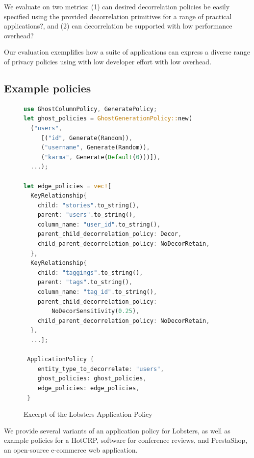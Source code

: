 %

We evaluate \sys on two metrics: (1) can desired decorrelation policies be easily specified using the
provided decorrelation primitives for a range of practical applications?, and (2) can decorrelation
be supported with low performance overhead?

Our evaluation exemplifies how a suite of applications can express a diverse
range of privacy policies using \sys with low developer effort with low overhead.

\subsection{Example policies}
\begin{figure}
\begin{lstlisting}[language=Rust]
use GhostColumnPolicy, GeneratePolicy;
let ghost_policies = GhostGenerationPolicy::new(
  ("users", 
     [("id", Generate(Random)),
     ("username", Generate(Random)),
     ("karma", Generate(Default(0)))]),
  ...);

let edge_policies = vec![
  KeyRelationship{
    child: "stories".to_string(),
    parent: "users".to_string(),
    column_name: "user_id".to_string(),
    parent_child_decorrelation_policy: Decor,
    child_parent_decorrelation_policy: NoDecorRetain,
  },
  KeyRelationship{
    child: "taggings".to_string(),
    parent: "tags".to_string(),
    column_name: "tag_id".to_string(),
    parent_child_decorrelation_policy: 
        NoDecorSensitivity(0.25),
    child_parent_decorrelation_policy: NoDecorRetain,
  },
  ...];

 ApplicationPolicy {
    entity_type_to_decorrelate: "users",
    ghost_policies: ghost_policies,
    edge_policies: edge_policies,
 }
\end{lstlisting}
    \label{fig:policy}
    \caption{Excerpt of the Lobsters Application Policy}
\end{figure}
We provide several variants of an application policy for Lobsters, as well as example policies for a
HotCRP, software for conference reviews, and PrestaShop, an
open-source e-commerce web application.

